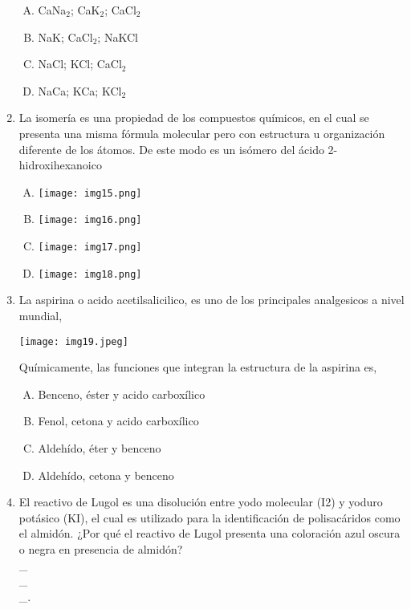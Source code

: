 \begin{enumerate}
\begin{enumerate}[(A)]
\item   CaNa$_2$; CaK$_2$; CaCl$_2$
\item NaK; CaCl$_2$; NaKCl
\item NaCl; KCl; CaCl$_2$
\item NaCa; KCa; KCl$_2$
\end{enumerate}



\newpage
\item  La isomería es una propiedad de los compuestos químicos, en el cual se presenta una misma fórmula molecular pero con estructura u organización diferente de los átomos. De este modo es un isómero del ácido 2-hidroxihexanoico \label{jenn-19}


\begin{enumerate}[(A)]
\item \texttt{[image: img15.png]}
\item \texttt{[image: img16.png]}
\item \texttt{[image: img17.png]}\\
\item \texttt{[image: img18.png]}
\end{enumerate}




\item La aspirina o acido acetilsalicilico, es uno de los principales analgesicos a nivel mundial, \label{jenn-20}

\begin{center}
\texttt{[image: img19.jpeg]}
\end{center}

Químicamente, las funciones que integran la estructura de la aspirina es,


\begin{enumerate}[(A)]
\item   Benceno, éster y acido carboxílico
\item Fenol, cetona y acido carboxílico
\item Aldehído, éter y benceno
\item Aldehído, cetona y benceno
\end{enumerate}




\item El reactivo de Lugol es una disolución entre yodo molecular (I2) y yoduro potásico (KI), el cual es utilizado para la identificación de polisacáridos como el almidón. ¿Por qué el reactivo de Lugol presenta una coloración azul oscura o negra en presencia de almidón? \label{jenn-21}\hrulefill\\
\_\hrulefill\\
\_\hrulefill\\
\_\hrulefill.




\end{enumerate}
